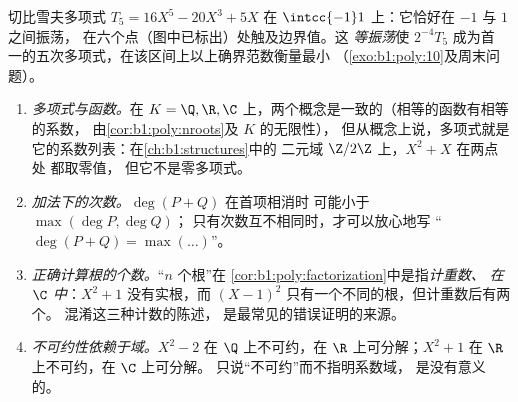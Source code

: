 \begin{omfigure}

{\small 切比雪夫多项式 $T_5 = 16X^5 - 20X^3 + 5X$ 在
$\intcc{-1}1$ 上：它恰好在 $-1$ 与 $1$ 之间振荡，
在六个点（图中已标出）处触及边界值。这
\emph{等振荡}使 $2^{-4}T_5$ 成为首
一的五次多项式，在该区间上以上确界范数衡量最小
（\cref{exo:b1:poly:10}及周末问题）。}
\end{omfigure}

\begin{remark}[多项式的常见误区]\label{rem:b1:poly:pitfalls}
\begin{enumerate}
  \item \emph{多项式与函数。}在 $K = \Q, \R, \C$
        上，两个概念是一致的（相等的函数有相等的系数，
        由\cref{cor:b1:poly:nroots}及 $K$ 的无限性），
        但从概念上说，多项式就是它的系数列表：在\cref{ch:b1:structures}中的
        二元域 $\Z/2\Z$ 上，$X^2 + X$ 在两点处
        都取零值，
        但它不是零多项式。
  \item \emph{加法下的次数。}$\deg(P + Q)$ 在首项相消时
        可能小于 $\max(\deg P, \deg Q)$；
        只有次数互不相同时，才可以放心地写
        “$\deg(P + Q) = \max(\dots)$”。
  \item \emph{正确计算根的个数。}“$n$ 个根”在
        \cref{cor:b1:poly:factorization}中是指\emph{计重数、
        在 $\C$ 中}：$X^2 + 1$ 没有实根，而
        $(X-1)^2$ 只有一个不同的根，但计重数后有两个。
        混淆这三种计数的陈述，
        是最常见的错误证明的来源。
  \item \emph{不可约性依赖于域。}$X^2 - 2$ 在
        $\Q$ 上不可约，在 $\R$ 上可分解；$X^2 + 1$ 在
        $\R$ 上不可约，在 $\C$ 上可分解。
        只说“不可约”而不指明系数域，
        是没有意义的。
\end{enumerate}
\end{remark}

